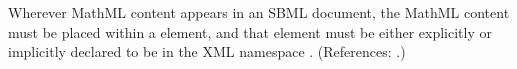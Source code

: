Wherever MathML content appears in an SBML document, the MathML content
must be placed within a  element, and that  element
must be either explicitly or implicitly declared to be in the XML namespace
.  (References: .) 
